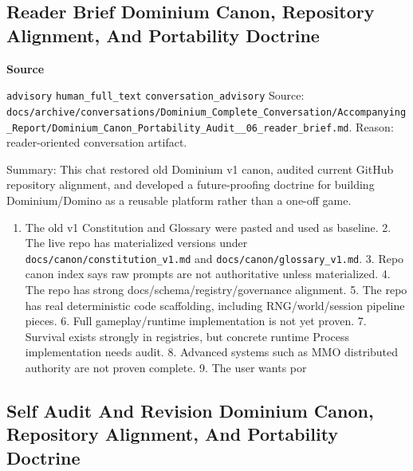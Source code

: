 \documentclass[9pt,a4paper,openany]{book}
\newcommand{\vonecallout}[3]{\par\medskip\noindent\begingroup\setlength{\fboxsep}{7pt}\colorbox{DomCalloutBg}{\parbox{0.94\linewidth}{\textbf{\textcolor{#1}{#2}}\par #3}}\endgroup\par\medskip}
\begin{document}
\subsection{Reader Brief Dominium Canon, Repository Alignment, And Portability Doctrine}

\vonecallout{DomSlate}{Source}{\texttt{advisory} \texttt{human\_\allowbreak{}full\_\allowbreak{}text} \texttt{conversation\_\allowbreak{}advisory} Source: \texttt{docs/\allowbreak{}archive/\allowbreak{}conversations/\allowbreak{}Dominium\_\allowbreak{}Complete\_\allowbreak{}Conversation/\allowbreak{}Accompanying\_\allowbreak{}Report/\allowbreak{}Dominium\_\allowbreak{}Canon\_\allowbreak{}Portability\_\allowbreak{}Audit\_\allowbreak{}\_\allowbreak{}06\_\allowbreak{}reader\_\allowbreak{}brief.\allowbreak{}md}.\allowbreak{} Reason: reader-\allowbreak{}oriented conversation artifact.\allowbreak{}}

Summary: This chat restored old Dominium v1 canon, audited current GitHub repository alignment, and developed a future-\allowbreak{}proofing doctrine for building Dominium/\allowbreak{}Domino as a reusable platform rather than a one-\allowbreak{}off game.\allowbreak{}


\begin{enumerate}
\item The old v1 Constitution and Glossary were pasted and used as baseline.\allowbreak{} 2.\allowbreak{} The live repo has materialized versions under \texttt{docs/\allowbreak{}canon/\allowbreak{}constitution\_\allowbreak{}v1.\allowbreak{}md} and \texttt{docs/\allowbreak{}canon/\allowbreak{}glossary\_\allowbreak{}v1.\allowbreak{}md}.\allowbreak{} 3.\allowbreak{} Repo canon index says raw prompts are not authoritative unless materialized.\allowbreak{} 4.\allowbreak{} The repo has strong docs/\allowbreak{}schema/\allowbreak{}registry/\allowbreak{}governance alignment.\allowbreak{} 5.\allowbreak{} The repo has real deterministic code scaffolding, including RNG/\allowbreak{}world/\allowbreak{}session pipeline pieces.\allowbreak{} 6.\allowbreak{} Full gameplay/\allowbreak{}runtime implementation is not yet proven.\allowbreak{} 7.\allowbreak{} Survival exists strongly in registries, but concrete runtime Process implementation needs audit.\allowbreak{} 8.\allowbreak{} Advanced systems such as MMO distributed authority are not proven complete.\allowbreak{} 9.\allowbreak{} The user wants por
\end{enumerate}


\subsection{Self Audit And Revision Dominium Canon, Repository Alignment, And Portability Doctrine}
\end{document}
